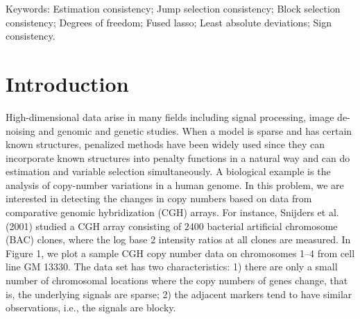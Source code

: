 \documentclass[12pt]{article}
\begin{document}
\bigskip
{Keywords:} Estimation consistency;
Jump selection consistency; Block selection consistency; Degrees of freedom;  Fused lasso;
Least absolute deviations; Sign consistency.


\newpage
\setcounter{equation}{0}

\newpage
\setcounter{equation}{0}



\section{Introduction}



High-dimensional data arise in many fields including signal
processing, image de-noising
and genomic and genetic studies. When a model is sparse and has certain known structures, penalized methods have been
widely used  since they can incorporate
known structures into penalty functions in a natural way and can do estimation and variable selection simultaneously.
A biological example is the analysis of copy-number
variations  in a human genome.  In this problem,  we are interested in
detecting the changes in copy numbers based on
data from comparative genomic hybridization (CGH) arrays.
For instance, Snijders et al. (2001) studied a CGH array consisting of $2400$ bacterial artificial chromosome (BAC) clones, where
the log base 2 intensity ratios at all clones are measured. In Figure 1, we plot a sample CGH copy number data on chromosomes 1--4 from cell line GM 13330. The data set has two characteristics:
1) there are only a small number of chromosomal locations where
the copy numbers of genes change, that is, the underlying signals are
sparse;
2)  the adjacent markers tend to have similar observations, i.e., the signals are blocky.
\end{document}
